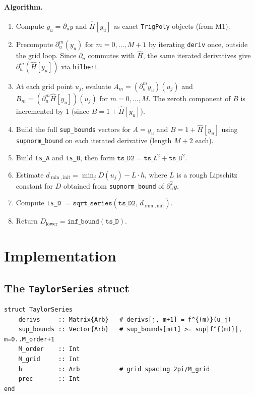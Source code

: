 \documentclass[11pt]{article}
\theoremstyle{definition}
\begin{document}
\paragraph{Algorithm.}
\begin{enumerate}
  \item Compute $y_u = \partial_u y$ and $\hat H[y_u]$ as exact \texttt{TrigPoly}
        objects (from M1).
  \item Precompute $\partial_u^m(y_u)$ for $m = 0,\ldots,M+1$ by iterating
        \texttt{deriv} once, outside the grid loop.
        Since $\partial_u$ commutes with $\hat H$, the same iterated derivatives
        give $\partial_u^m(\hat H[y_u])$ via \texttt{hilbert}.
  \item At each grid point $u_j$, evaluate $A_m = (\partial_u^m y_u)(u_j)$ and
        $B_m = (\partial_u^m \hat H[y_u])(u_j)$ for $m = 0,\ldots,M$.
        The zeroth component of $B$ is incremented by 1 (since $B = 1 + \hat H[y_u]$).
  \item Build the full \texttt{sup\_bounds} vectors for $A = y_u$ and
        $B = 1 + \hat H[y_u]$ using \texttt{supnorm\_bound} on each iterated derivative
        (length $M{+}2$ each).
  \item Build \texttt{ts\_A} and \texttt{ts\_B}, then form
        $\texttt{ts\_D2} = \texttt{ts\_A}^2 + \texttt{ts\_B}^2$.
  \item Estimate $d_{\min,\mathrm{init}} = \min_j D(u_j) - L \cdot h$,
        where $L$ is a rough Lipschitz constant for $D$ obtained from
        \texttt{supnorm\_bound} of $\partial_u^2 y$.
  \item Compute \texttt{ts\_D} $= \texttt{sqrt\_series}(\texttt{ts\_D2},\,
        d_{\min,\mathrm{init}})$.
  \item Return $D_{\mathrm{lower}} = \texttt{inf\_bound}(\texttt{ts\_D})$.
\end{enumerate}

\section{Implementation}

\subsection{The \texttt{TaylorSeries} struct}

\begin{lstlisting}
struct TaylorSeries
    derivs     :: Matrix{Arb}   # derivs[j, m+1] = f^{(m)}(u_j)
    sup_bounds :: Vector{Arb}   # sup_bounds[m+1] >= sup|f^{(m)}|, m=0..M_order+1
    M_order    :: Int
    M_grid     :: Int
    h          :: Arb           # grid spacing 2pi/M_grid
    prec       :: Int
end
\end{lstlisting}
\end{document}
